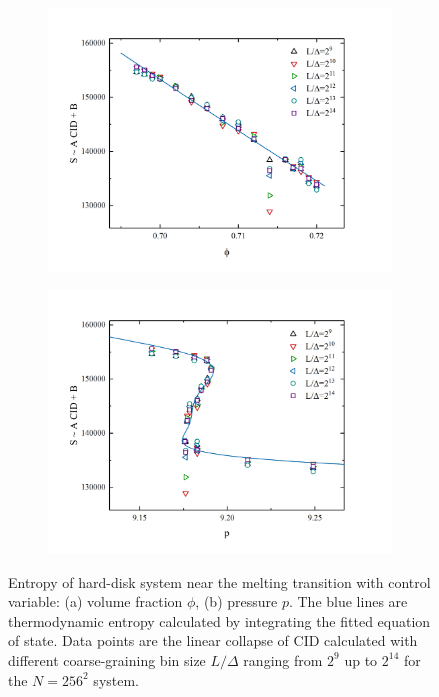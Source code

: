 \documentclass[a4paper]{article}
\begin{document}
\begin{figure}[ht]
	\begin{subfigure}[ht]{.5\textwidth}
		\centering 
		\includegraphics[width=1\columnwidth]{phi_cid_grid.png}
		\caption{}
		\label{fig:phi_cid_grid}
	\end{subfigure}
	\begin{subfigure}[ht]{.5\textwidth}
		\centering
		\includegraphics[width=1\columnwidth]{p_cid_grid.png}
		\caption{}
		\label{fig:p_cid_grid}
	\end{subfigure}
	\caption{
		 Entropy of hard-disk system near the melting transition with control variable: (a) volume fraction $\phi$, (b) pressure $p$. The blue lines are thermodynamic entropy calculated by  integrating the fitted equation of state. Data points are the linear collapse of CID calculated with different coarse-graining bin size $L/\Delta$ ranging from $2^9$ up to $2^{14}$ for the $N=256^2$ system.
	}
	\label{fig:cid_grid}
\end{figure}
\end{document}
